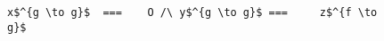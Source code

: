 \begin{figure}[!t]
  \centering
  \begin{minipage}{\columnwidth}
    \begin{lstlisting}[frame=tb]
  x$^{g \to g}$  ===    O /\ y$^{g \to g}$ ===     z$^{f \to g}$
    \end{lstlisting}
  \end{minipage}
\end{figure}